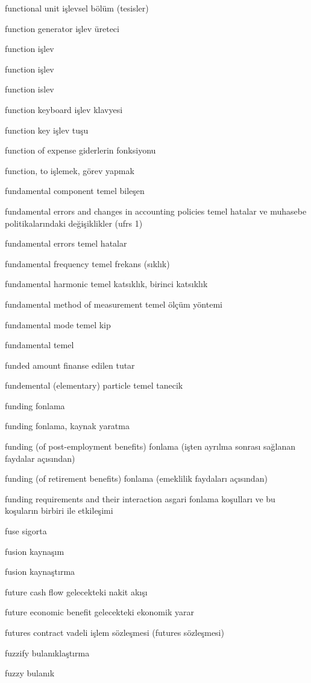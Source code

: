 \documentclass[12pt,fleqn]{article}\usepackage{../../common}
\begin{document}
functional unit işlevsel bölüm (tesisler)

function generator işlev üreteci

function işlev

function işlev

function islev

function keyboard işlev klavyesi

function key işlev tuşu

function of expense giderlerin fonksiyonu

function, to işlemek, görev yapmak

fundamental component temel bileşen

fundamental errors and changes in accounting policies temel hatalar ve muhasebe politikalarındaki değişiklikler (ufrs 1)

fundamental errors temel hatalar

fundamental frequency temel frekans (sıklık)

fundamental harmonic temel katsıklık, birinci katsıklık

fundamental method of measurement temel ölçüm yöntemi

fundamental mode temel kip

fundamental temel

funded amount finanse edilen tutar

fundemental (elementary) particle temel tanecik

funding fonlama

funding fonlama, kaynak yaratma

funding (of post-employment benefits) fonlama (işten ayrılma sonrası sağlanan faydalar açısından)

funding (of retirement benefits) fonlama (emeklilik faydaları açısından)

funding requirements and their interaction asgari fonlama koşulları ve bu koşuların birbiri ile etkileşimi

fuse sigorta

fusion kaynaşım

fusion kaynaştırma

future cash flow gelecekteki nakit akışı

future economic benefit gelecekteki ekonomik yarar

futures contract vadeli işlem sözleşmesi (futures sözleşmesi)

fuzzify bulanıklaştırma

fuzzy bulanık
\end{document}
